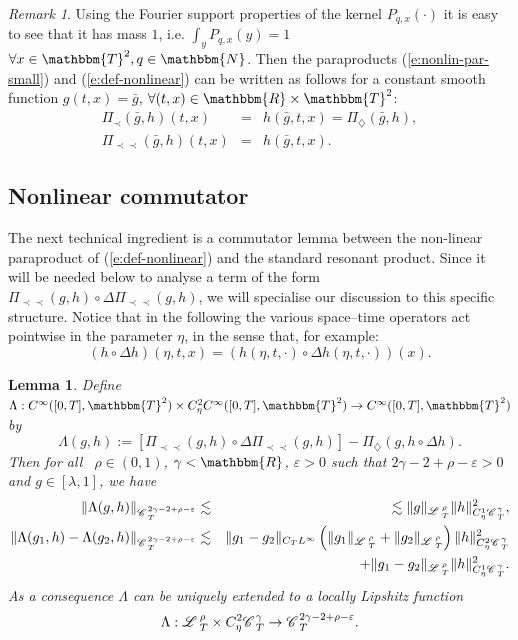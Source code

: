 \documentclass{amsart}
\newcommand{\assign}{:=}
\newcommand{\cdummy}{\cdot}
\newcommand{\precprec}{\prec\!\!\!\prec}
\newtheorem{lemma}[theorem]{Lemma}
\theoremstyle{remark}
\newtheorem{remark}[theorem]{Remark}
\theoremstyle{definition}
\newcommand{\CC}{\mathscr{C} \hspace{.1em}}
\newcommand{\LL}{\mathscr{L} \hspace{.2em}}
\begin{document}
\begin{remark}
  \label{rem:dumb}Using the Fourier support properties of the kernel $P_{q, x}
  (\cdummy)$ it is easy to see that it has mass $1$, i.e. $\int_y P_{q, x} (y)
  = 1$ $\forall x \in \mathbbm{T}^2, q \in \mathbbm{N}$. Then the paraproducts
  (\ref{e:nonlin-par-small}) and (\ref{e:def-nonlinear}) can be written as
  follows for a constant smooth function $g (t, x) = \bar{g}$, $\forall (t, x)
  \in \mathbbm{R} \times \mathbbm{T}^2$:
  \begin{eqnarray*}
    \Pi_{\prec} (\bar{g}, h) (t, x) & = & h (\bar{g}, t, x) =
    \Pi_{\diamondsuit} (\bar{g}, h),\\
    \Pi_{\precprec} (\bar{g}, h) (t, x) & = & h (\bar{g}, t, x) .
  \end{eqnarray*}
\end{remark}

\subsection{Nonlinear commutator}

The next technical ingredient is a commutator lemma between the non-linear
paraproduct of (\ref{e:def-nonlinear}) and the standard resonant product.
Since it will be needed below to analyse a term of the form $\Pi_{\precprec}
(g, h) \circ \Delta \Pi_{\precprec} (g, h)$, we will specialise our discussion
to this specific structure. Notice that in the following the various
space--time operators act pointwise in the parameter $\eta$, in the sense
that, for example:
\[ (h \circ \Delta h) (\eta, t, x) = (h (\eta, t, \cdot) \circ \Delta h (\eta,
   t, \cdot)) (x) . \]
\begin{lemma}
  \label{l:nonlin-comm}Define $\Lambda : C^{\infty} ([0, T], \mathbbm{T}^2)
  \times C_{\eta}^2 C^{\infty} ([0, T], \mathbbm{T}^2) \rightarrow C^{\infty}
  ([0, T], \mathbbm{T}^2)$ by
  \[ \Lambda (g, h) \assign [\Pi_{\precprec} (g, h) \circ \Delta
     \Pi_{\precprec} (g, h)] - \Pi_{\diamondsuit} (g, h \circ \Delta h) . \]
  Then for all \ $\rho \in (0, 1)$, $\gamma <\mathbbm{R}$, $\varepsilon > 0$
  such that $2 \gamma - 2 + \rho - \varepsilon > 0$ and $g \in [\lambda, 1]$,
  we have
  \begin{eqnarray*}
    \| \Lambda (g, h) \|_{\CC_T^{2 \gamma - 2 + \rho - \varepsilon}} &
    \lesssim & \lesssim \| g \|_{\LL_T^{\rho}} \| h \|_{C^1_{\eta}
    \CC^{\gamma}_T}^2,\\
    \| \Lambda (g_1, h) - \Lambda (g_2, h) \|_{\CC_T^{2 \gamma - 2 + \rho -
    \varepsilon}} & \lesssim & \| g_1 - g_2 \|_{C_T L^{\infty}} \left( \| g_1
    \|_{\LL^{\rho}_T} + \| g_2 \|_{\LL^{\rho}_T} \right) \| h \|^2_{C_{\eta}^2
    \CC^{\gamma}_T}\\
    &  & + \| g_1 - g_2 \|_{\LL^{\rho}_T} \| h \|^2_{C_{\eta}^1
    \CC^{\gamma}_T} .
  \end{eqnarray*}
  As a consequence $\Lambda$ can be uniquely extended to a locally Lipshitz
  function
  \[ \Lambda : \LL^{\rho}_T \times C_{\eta}^2 \CC_T^{\gamma} \rightarrow
     \CC_T^{2 \gamma - 2 + \rho - \varepsilon} . \]
\end{lemma}
\end{document}
